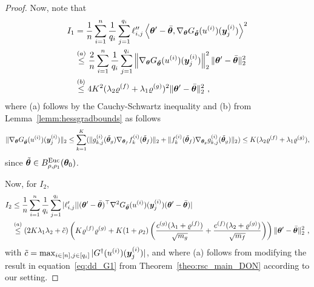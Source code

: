 \begin{proof}
Now, note that
\begin{align*}
I_1 & = \frac{1}{n} \sum_{i=1}^n  \frac{1}{q_i} \sum_{j=1}^{q_i} \ell^{\prime\prime}_{i,j} \left\langle {\bm{\theta}}'-\bar{{\bm{\theta}}}, \nabla_{{\bm{\theta}}} G_{\tilde{{\bm{\theta}}}}(u^{(i)})({\bm{y}}^{(i)}_j) \right\rangle^2 \\
& \overset{(a)}{\leq} \frac{2}{n} \sum_{i=1}^n \frac{1}{q_i}\sum_{j=1}^{q_i} \left\| \nabla_{{\bm{\theta}}} G_{\tilde{{\bm{\theta}}}}(u^{(i)})({\bm{y}}^{(i)}_j) \right\|_2^2 \|{\bm{\theta}}' - \bar{{\bm{\theta}}} \|_2^2 \\
& \overset{(b)}{\leq} 4K^2(\lambda_2\varrho^{(f)}+\lambda_1\varrho^{(g)})^2 \| {\bm{\theta}}' - \bar{{\bm{\theta}}} \|_2^2~,
\end{align*}
where (a) follows by the Cauchy-Schwartz inequality and (b) from Lemma~\ref{lemm:hessgradbounds} as follows
\begin{equation*}
\lVert\nabla_{{\bm{\theta}}}G_{\tilde{{\bm{\theta}}}}(u^{(i)})({\bm{y}}^{(i)}_j)\rVert_2\leq\sum^K_{k=1}(
\lVert g_{k,j}^{(i)}(\tilde{{\bm{\theta}}}_g)\nabla_{{\bm{\theta}}_f}f_k^{(i)}(\tilde{{\bm{\theta}}}_f)\rVert_2
+
\lVert
f_{k}^{(i)}(\tilde{{\bm{\theta}}}_f)\nabla_{{\bm{\theta}}_g}g_{k,j}^{(i)}(\tilde{{\bm{\theta}}}_g)
\rVert_2
)
\leq
K(\lambda_2\varrho^{(f)}+\lambda_1\varrho^{(g)}),
\end{equation*}
since $\tilde{{\bm{\theta}}}\in B^{\mathrm{Euc}}_{\rho,\rho_1}({\bm{\theta}}_0)$.

Now, for $I_2$, 
\begin{align*}
I_2 & \leq \frac{1}{n} \sum_{i=1}^n \frac{1}{q_i} \sum_{j=1}^{q_i} |\ell^{\prime}_{i,j}|  |({\bm{\theta}}'-\bar{{\bm{\theta}}})^\top \nabla^2 G_{\tilde{{\bm{\theta}}}}(u^{(i)})({\bm{y}}^{(i)}_j) ({\bm{\theta}}'-\bar{{\bm{\theta}}})| \\
& \overset{(a)}{\leq}
(2K\lambda_1\lambda_2+\tilde{c})\left(K\varrho^{(f)}\varrho^{(g)}+K(1+\rho_2) 
\left( \frac{c^{(g)} (\lambda_1+\varrho^{(f)})}{\sqrt{m_g}} + \frac{c^{(f)} (\lambda_2+\varrho^{(g)})}{\sqrt{m_f}} \right)\right)
\| {\bm{\theta}}' - \bar{{\bm{\theta}}} \|_2^2~,
\end{align*}
with  $\tilde{c}=\max_{i\in[n],j\in[q_i]}|G^\dagger(u^{(i)})({\bm{y}}^{(i)}_j)|$, and where (a) follows from modifying the result in equation~\eqref{eq:dd_G1} from Theorem~\ref{theo:rsc_main_DON} according to our setting.
%


\end{proof}
